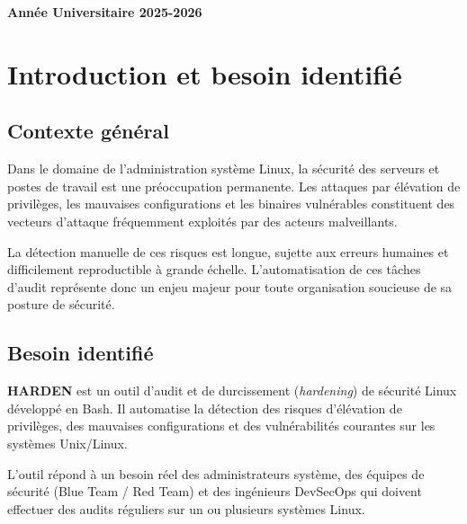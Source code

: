 \documentclass[12pt,a4paper]{article}
\begin{document}
\begin{center}
  \vfill
  {\large\bfseries\color{grisTexte} Année Universitaire 2025-2026}
\end{center}



\newpage

\tableofcontents
\newpage

\section{Introduction et besoin identifié}

\subsection{Contexte général}

Dans le domaine de l'administration système Linux, la sécurité des serveurs et postes de travail est une préoccupation permanente. Les attaques par élévation de privilèges, les mauvaises configurations et les binaires vulnérables constituent des vecteurs d'attaque fréquemment exploités par des acteurs malveillants.

La détection manuelle de ces risques est longue, sujette aux erreurs humaines et difficilement reproductible à grande échelle. L'automatisation de ces tâches d'audit représente donc un enjeu majeur pour toute organisation soucieuse de sa posture de sécurité.

\subsection{Besoin identifié}

\textbf{HARDEN} est un outil d'audit et de durcissement (\textit{hardening}) de sécurité Linux développé en Bash. Il automatise la détection des risques d'élévation de privilèges, des mauvaises configurations et des vulnérabilités courantes sur les systèmes Unix/Linux.

L'outil répond à un besoin réel des administrateurs système, des équipes de sécurité (Blue Team / Red Team) et des ingénieurs DevSecOps qui doivent effectuer des audits réguliers sur un ou plusieurs systèmes Linux.
\end{document}
